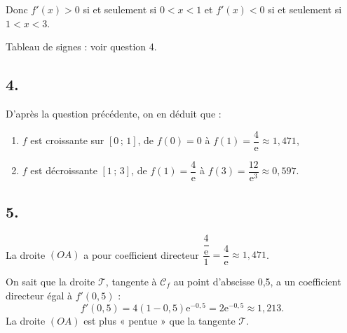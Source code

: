 \documentclass[10pt]{article}
\providecommand{\e}{{\mathrm{e}}}
\begin{document}
Donc \( f'(x) > 0 \) si et seulement si \( 0 < x < 1 \) et \( f'(x) < 0 \) si et seulement si \( 1 < x < 3 \).

Tableau de signes : voir question 4.

\subsection*{4.}

D'après la question précédente, on en déduit que :
\begin{enumerate}[label=-]
    \item \( f \) est croissante sur \( [0 \,;\, 1] \), de \( f(0) = 0 \) à \( f(1) = \dfrac{4}{\e} \approx 1{,}471 \),
    \item \( f \) est décroissante \( [1 \,;\, 3] \), de \( f(1) = \dfrac{4}{\e} \) à \( f(3) = \dfrac{12}{\e^3} \approx 0{,}597 \).
\end{enumerate}

\begin{center}
\end{center}

\subsection*{5.}

La droite \((OA)\) a pour coefficient directeur \( \dfrac{\dfrac{4}{\e}}{1} = \dfrac{4}{\e} \approx 1{,}471 \).

On sait que la droite \(\mathcal{T}\), tangente à \(\mathcal{C}_f\) au point d'abscisse 0,5, a un coefficient directeur égal à \( f'(0,5) \) :
\[
f'(0,5) = 4(1 - 0,5)\e^{-0,5} = 2\e^{-0,5} \approx 1{,}213.
\]
La droite \((OA)\) est plus « pentue » que la tangente \( \mathcal{T} \).
\end{document}
